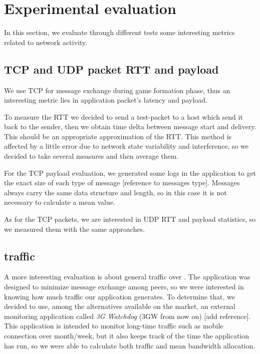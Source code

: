 \section{Experimental evaluation}

In this section, we evaluate through different tests some interesting metrics related to network activity.

\subsection{TCP and UDP packet RTT and payload}

We use TCP for message exchange during game formation phase, thus an interesting metric lies in application packet's latency and payload.
 
To measure the RTT we decided to send a test-packet to a host which send it back to the sender, then we obtain time delta between message start and delivery. This should be an appropriate approximation of the RTT. This method is affected by a little error due to network state variability and interference, so we decided to take several measures and then average them.

For the TCP payload evaluation, we generated some logs in the application to get the exact size of each type of message [reference to messages type]. Messages always carry the same data structure and length, so in this case it is not necessary to calculate a mean value.

As for the TCP packets, we are interested in UDP RTT and payload statistics, so we measured them with the same approaches.

\subsection{\wifi{} traffic}

A more interesting evaluation is about general traffic over \wifi. The application was designed to minimize message exchange among peers, so we were interested in knowing how much traffic our application generates. To determine that, we decided to use, among the alternatives available on the market, an external monitoring application called \textit{3G Watchdog} (3GW from now on) [add reference]. This application is intended to monitor long-time traffic such as mobile connection over month/week, but it also keeps track of the time the application has run, so we were able to calculate both traffic and mean bandwidth allocation.

